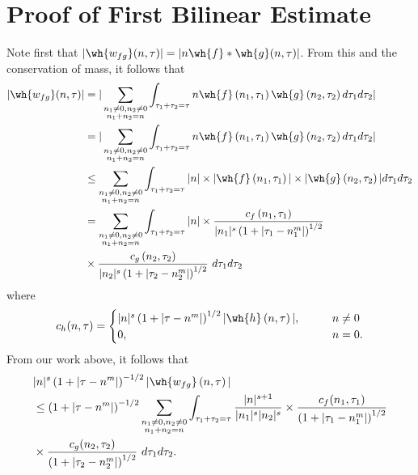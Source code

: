 \section{Proof of First Bilinear Estimate}
Note first that $|\wh{w_{fg}}(n, \tau) |  = | n\wh{f} *  \wh{g} 
(n, \tau)|$. From this and the conservation of mass, it follows that
%
%
\begin{equation}
	\label{1non-lin-rep}
	\begin{split}
		| \wh{w_{fg}}(n, \tau)|
		& = | \sum_{\substack{n_1 \neq 0, n_2 \neq 0 \\n_1 +n_2 =n}}  \int_{\tau_1 + \tau_2 = \tau}n\wh{f}\left( n_1,  \tau_1 
\right) \wh{g}\left( n_2, \tau_2  
\right) d \tau_1 d \tau_2 |
\\
& = | \sum_{\substack{n_1 \neq0, n_2 \neq 0 \\n_1 + n_2 =n}}  \int_{\tau_1 + \tau_2 = \tau}n\wh{f}\left( n_1,  \tau_1 
\right) \wh{g}\left( n_2, \tau_2  
\right) d \tau_1 d \tau_2 | 
\\
& \le \sum_{\substack{n_1 \neq0, n_2 \neq 0 \\n_1 + n_2 =n}}   \int_{\tau_1 + \tau_2 = \tau}| n | \times | \wh{f}\left( n_1, \tau_1 
\right) | \times  | \wh{g}\left( n_2, \tau_2 
\right) |   d \tau_1 d \tau_2  
\\
& = \sum_{\substack{n_1 \neq0, n_2 \neq 0 \\n_1 + n_2 =n}} \int_{\tau_1 + \tau_2 = \tau}| n | \times \frac{c_f\left( n_1, \tau_1 
\right)}{|n_1|^s \left( 1 + | \tau_1 - n_1^m | \right)^{1/2}}
\\
& \times \frac{c_{g}\left( n_2, \tau_2 \right)}{|n_2|^s\left( 1 + | \tau_2 -  n_2^m| 
\right)^{1/2}}
  \ d \tau_1 d \tau_2 
\end{split}
\end{equation}
%
%
where 
%
%
\begin{equation*}
	\begin{split}
		c_h(n, \tau) =
		\begin{cases}
			|n|^s \left( 1 + | \tau - n^m |  
			\right)^{1/2} | \wh{h}\left( n, \tau \right) |, \qquad & n \neq 0
		\\
		0, \qquad & n = 0.
	\end{cases}
	\end{split}
\end{equation*}
%
%
From our work above, it follows that 
%
%
\begin{equation}
	\label{1convo-est-starting-pnt}
	\begin{split}
		 & |n|^s \left( 1 + | \tau - n^m | \right)^{-1/2} | \wh{w_{fg}}\left( 
		n, \tau \right) |
		\\
		& \le \left( 1 + | \tau - n^m | \right)^{-1/2}
		\sum_{\substack{n_1 \neq0, n_2 \neq 0 \\n_1 + n_2 =n}} \int_{\tau_1 + \tau_2 = \tau}\frac{|n|^{s+1}}{|n_1|^s | n_2|^s} 
		\times \frac{c_f(n_1, \tau_1)}{\left( 1 + | \tau_1 - n_1^m | 
		\right)^{1/2}}
		\\
		& \times
		\frac{c_g(n_2, \tau_2)}{\left( 1 + | \tau_2 - n_2^m | 
		\right)^{1/2}}\ d \tau_1 d \tau_2.
	\end{split}
\end{equation}
